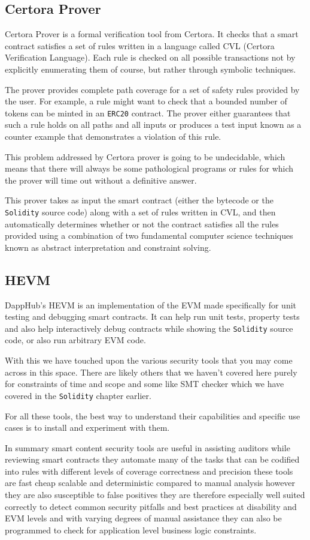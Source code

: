 \subsection{Certora Prover}\label{certora-prover}

Certora Prover is a formal verification tool from Certora. It checks
that a smart contract satisfies a set of rules written in a language
called CVL (Certora Verification Language). Each rule is checked on all
possible transactions not by explicitly enumerating them of course, but
rather through symbolic techniques.

The prover provides complete path coverage for a set of safety rules
provided by the user. For example, a rule might want to check that a
bounded number of tokens can be minted in an \texttt{ERC20} contract.
The prover either guarantees that such a rule holds on all paths and all
inputs or produces a test input known as a counter example that
demonstrates a violation of this rule.

This problem addressed by Certora prover is going to be undecidable,
which means that there will always be some pathological programs or
rules for which the prover will time out without a definitive answer.

This prover takes as input the smart contract (either the bytecode or
the \texttt{Solidity} source code) along with a set of rules written in
CVL, and then automatically determines whether or not the contract
satisfies all the rules provided using a combination of two fundamental
computer science techniques known as abstract interpretation and
constraint solving.

\subsection{HEVM}\label{hevm}

DappHub's HEVM is an implementation of the EVM made specifically for
unit testing and debugging smart contracts. It can help run unit tests,
property tests and also help interactively debug contracts while showing
the \texttt{Solidity} source code, or also run arbitrary EVM code.

With this we have touched upon the various security tools that you may
come across in this space. There are likely others that we haven't
covered here purely for constraints of time and scope and some like SMT
checker which we have covered in the \texttt{Solidity} chapter earlier.

For all these tools, the best way to understand their capabilities and
specific use cases is to install and experiment with them.

In summary smart content security tools are useful in assisting auditors
while reviewing smart contracts they automate many of the tasks that can
be codified into rules with different levels of coverage correctness and
precision these tools are fast cheap scalable and deterministic compared
to manual analysis however they are also susceptible to false positives
they are therefore especially well suited correctly to detect common
security pitfalls and best practices at disability and EVM levels and
with varying degrees of manual assistance they can also be programmed to
check for application level business logic constraints.
